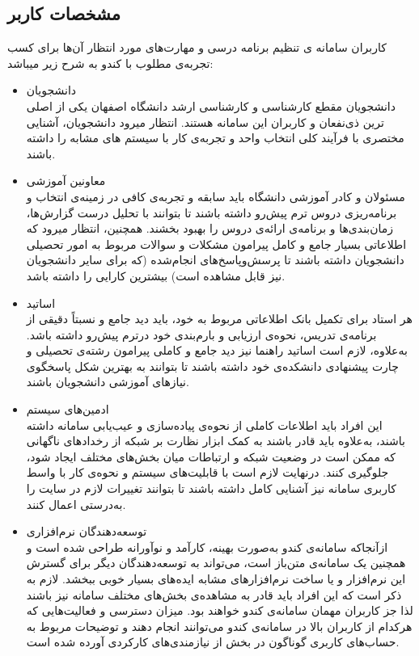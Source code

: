\documentclass{report}
\begin{document}
\subsection{مشخصات کاربر}
کاربران سامانه ی تنظیم برنامه درسی و مهارت‌های مورد انتظار آن‌ها برای کسب تجربه‌ی مطلوب با کندو به شرح زیر میباشد:
\begin{itemize}
\item دانشجویان\\ 
دانشجویان مقطع کارشناسی و کارشناسی ارشد دانشگاه اصفهان یکی از اصلی ترین ذی‌نفعان و کاربران این سامانه هستند. انتظار میرود دانشجویان، آشنایی مختصری با فرآیند کلی انتخاب واحد و تجربه‌ی کار با سیستم های مشابه را داشته باشند.
\item معاونین آموزشی
\\
مسئولان و کادر آموزشی دانشگاه باید سابقه و تجربه‌ی کافی در زمینه‌ی انتخاب و برنامه‌ریزی دروس ترم پیش‌رو داشته باشند تا بتوانند با تحلیل درست گزارش‌ها، زمان‌بندی‌ها و برنامه‌ی ارائه‌ی دروس را بهبود بخشند. همچنین، انتظار میرود که اطلاعاتی بسیار جامع و کامل پیرامون مشکلات و سوالات مربوط به امور تحصیلی دانشجویان داشته باشند تا پرسش‌وپاسخ‌های انجام‌شده (که برای سایر دانشجویان نیز قابل مشاهده است) بیشترین کارایی را داشته باشد.
\item اساتید
\\
هر استاد برای تکمیل بانک اطلاعاتی مربوط به خود، باید دید جامع و نسبتاً دقیقی از برنامه‌ی تدریس، نحوه‌ی ارزیابی و بارم‌بندی خود درترم پیش‌رو داشته باشد. به‌علاوه، لازم است اساتید راهنما نیز دید جامع و کاملی پیرامون رشته‌ی تحصیلی و چارت پیشنهادی دانشکده‌ی خود داشته باشند تا بتوانند به بهترین شکل پاسخگوی نیازهای آموزشی دانشجویان باشند.
\item
 ادمین‌های سیستم
 \\
این افراد باید اطلاعات کاملی از نحوه‌ی پیاده‌سازی و عیب‌یابی سامانه داشته باشند، به‌علاوه باید قادر باشند به کمک ابزار نظارت
 بر شبکه از رخدادهای ناگهانی که ممکن است در وضعیت شبکه و ارتباطات میان بخش‌های مختلف ایجاد شود، جلوگیری کنند. درنهایت لازم است با قابلیت‌های سیستم و نحوه‌ی کار با واسط کاربری سامانه نیز آشنایی کامل داشته باشند تا بتوانند تغییرات لازم در سایت را به‌درستی اعمال کنند.
\item توسعه‌دهندگان نرم‌افزاری 
 \\
ازآنجاکه سامانه‌ی کندو به‌صورت بهینه، کارآمد و نوآورانه طراحی شده است و همچنین یک سامانه‌ی متن‌باز است، می‌تواند به توسعه‌دهندگان دیگر برای گسترش این نرم‌افزار و یا ساخت نرم‌افزارهای مشابه ایده‌های بسیار خوبی ببخشد. لازم به ذکر است که این افراد باید قادر به مشاهده‌ی بخش‌های مختلف سامانه نیز باشند لذا جز کاربران مهمان سامانه‌ی کندو خواهند بود.
میزان دسترسی و فعالیت‌هایی که هرکدام از کاربران بالا در سامانه‌ی کندو می‌توانند انجام دهند و توضیحات مربوط به حساب‌های کاربری گوناگون در بخش
\hyperlink{ww}{\underline{}} 
 از نیازمندی‌های کارکردی آورده شده است.
\end{itemize}
\end{document}
